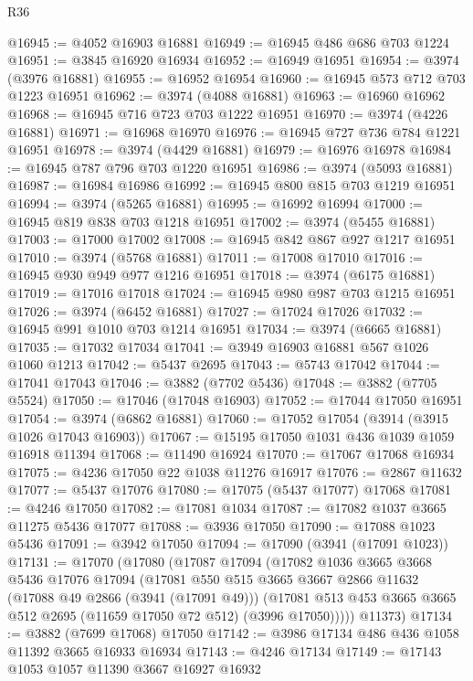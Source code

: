 \begin{lexlean}{R36}
\begin{coremodule}
@16945 := @4052 @16903 @16881
@16949 := @16945 @486 @686 @703 @1224
@16951 := @3845 @16920 @16934
@16952 := @16949 @16951
@16954 := @3974 (@3976 @16881)
@16955 := @16952 @16954
@16960 := @16945 @573 @712 @703 @1223 @16951
@16962 := @3974 (@4088 @16881)
@16963 := @16960 @16962
@16968 := @16945 @716 @723 @703 @1222 @16951
@16970 := @3974 (@4226 @16881)
@16971 := @16968 @16970
@16976 := @16945 @727 @736 @784 @1221 @16951
@16978 := @3974 (@4429 @16881)
@16979 := @16976 @16978
@16984 := @16945 @787 @796 @703 @1220 @16951
@16986 := @3974 (@5093 @16881)
@16987 := @16984 @16986
@16992 := @16945 @800 @815 @703 @1219 @16951
@16994 := @3974 (@5265 @16881)
@16995 := @16992 @16994
@17000 := @16945 @819 @838 @703 @1218 @16951
@17002 := @3974 (@5455 @16881)
@17003 := @17000 @17002
@17008 := @16945 @842 @867 @927 @1217 @16951
@17010 := @3974 (@5768 @16881)
@17011 := @17008 @17010
@17016 := @16945 @930 @949 @977 @1216 @16951
@17018 := @3974 (@6175 @16881)
@17019 := @17016 @17018
@17024 := @16945 @980 @987 @703 @1215 @16951
@17026 := @3974 (@6452 @16881)
@17027 := @17024 @17026
@17032 := @16945 @991 @1010 @703 @1214 @16951
@17034 := @3974 (@6665 @16881)
@17035 := @17032 @17034
@17041 := @3949 @16903 @16881 @567 @1026 @1060 @1213
@17042 := @5437 @2695
@17043 := @5743 @17042
@17044 := @17041 @17043
@17046 := @3882 (@7702 @5436)
@17048 := @3882 (@7705 @5524)
@17050 := @17046 (@17048 @16903)
@17052 := @17044 @17050 @16951
@17054 := @3974 (@6862 @16881)
@17060 := @17052 @17054 (@3914 (@3915 @1026 @17043 @16903))
@17067 := @15195 @17050 @1031 @436 @1039 @1059 @16918 @11394
@17068 := @11490 @16924
@17070 := @17067 @17068 @16934
@17075 := @4236 @17050 @22 @1038 @11276 @16917
@17076 := @2867 @11632
@17077 := @5437 @17076
@17080 := @17075 (@5437 @17077) @17068
@17081 := @4246 @17050
@17082 := @17081 @1034
@17087 := @17082 @1037 @3665 @11275 @5436 @17077
@17088 := @3936 @17050
@17090 := @17088 @1023 @5436
@17091 := @3942 @17050
@17094 := @17090 (@3941 (@17091 @1023))
@17131 := @17070
    (@17080
      (@17087
        @17094
        (@17082
          @1036
          @3665
          @3668
          @5436
          @17076
          @17094
          (@17081
            @550
            @515
            @3665
            @3667
            @2866
            @11632
            (@17088 @49 @2866 (@3941 (@17091 @49)))
            (@17081 @513 @453 @3665 @3665 @512 @2695 (@11659 @17050 @72 @512) (@3996 @17050)))))
      @11373)
@17134 := @3882 (@7699 @17068) @17050
@17142 := @3986 @17134 @486 @436 @1058 @11392 @3665 @16933 @16934
@17143 := @4246 @17134
@17149 := @17143 @1053 @1057 @11390 @3667 @16927 @16932

\end{coremodule}
\end{lexlean}
